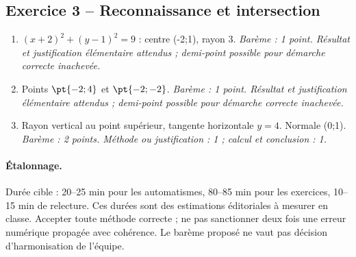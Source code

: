 \subsection*{Exercice 3 -- Reconnaissance et intersection}
\begin{enumerate}
\item $(x+2)^2+(y-1)^2=9$ : centre (-2;1), rayon 3. \textit{Barème : 1 point. Résultat et justification élémentaire attendus ; demi-point possible pour démarche correcte inachevée.}
\item Points $\pt{-2;4}$ et $\pt{-2;-2}$. \textit{Barème : 1 point. Résultat et justification élémentaire attendus ; demi-point possible pour démarche correcte inachevée.}
\item Rayon vertical au point supérieur, tangente horizontale $y=4$. Normale (0;1). \textit{Barème : 2 points. Méthode ou justification : 1 ; calcul et conclusion : 1.}
\end{enumerate}
\paragraph{Étalonnage.} Durée cible : 20–25 min pour les automatismes, 80–85 min pour les exercices, 10–15 min de relecture. Ces durées sont des estimations éditoriales à mesurer en classe. Accepter toute méthode correcte ; ne pas sanctionner deux fois une erreur numérique propagée avec cohérence. Le barème proposé ne vaut pas décision d’harmonisation de l’équipe.
